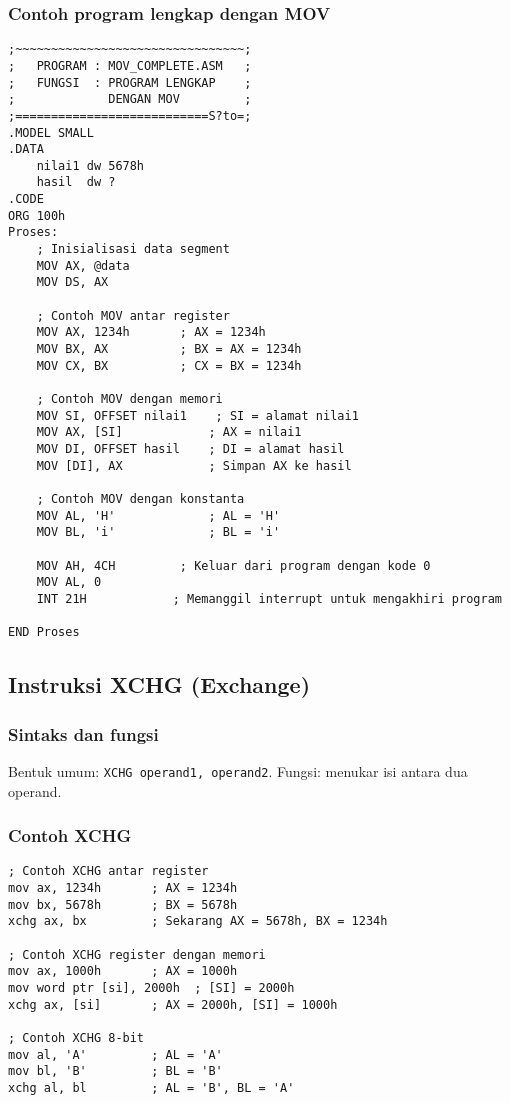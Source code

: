 \documentclass[../main.tex]{subfiles}
\begin{document}
            \subsubsection{Contoh program lengkap dengan MOV}
\begin{lstlisting}[language={[x86masm]Assembler}, caption=Program Lengkap dengan MOV, label={lst:mov-complete}]
;~~~~~~~~~~~~~~~~~~~~~~~~~~~~~~~~;
;   PROGRAM : MOV_COMPLETE.ASM   ;
;   FUNGSI  : PROGRAM LENGKAP    ;
;             DENGAN MOV         ;
;===========================S?to=;
.MODEL SMALL
.DATA
    nilai1 dw 5678h
    hasil  dw ?
.CODE
ORG 100h
Proses:
    ; Inisialisasi data segment
    MOV AX, @data
    MOV DS, AX
    
    ; Contoh MOV antar register
    MOV AX, 1234h       ; AX = 1234h
    MOV BX, AX          ; BX = AX = 1234h
    MOV CX, BX          ; CX = BX = 1234h
    
    ; Contoh MOV dengan memori
    MOV SI, OFFSET nilai1    ; SI = alamat nilai1
    MOV AX, [SI]            ; AX = nilai1
    MOV DI, OFFSET hasil    ; DI = alamat hasil
    MOV [DI], AX            ; Simpan AX ke hasil
    
    ; Contoh MOV dengan konstanta
    MOV AL, 'H'             ; AL = 'H'
    MOV BL, 'i'             ; BL = 'i'
    
    MOV AH, 4CH         ; Keluar dari program dengan kode 0
    MOV AL, 0
    INT 21H            ; Memanggil interrupt untuk mengakhiri program

END Proses
\end{lstlisting}

        \subsection{Instruksi XCHG (Exchange)}
            \subsubsection{Sintaks dan fungsi}
Bentuk umum: \texttt{XCHG operand1, operand2}. Fungsi: menukar isi antara dua operand.

            \subsubsection{Contoh XCHG}
\begin{lstlisting}[language={[x86masm]Assembler}, caption=Instruksi XCHG, label={lst:xchg-examples}]
; Contoh XCHG antar register
mov ax, 1234h       ; AX = 1234h
mov bx, 5678h       ; BX = 5678h
xchg ax, bx         ; Sekarang AX = 5678h, BX = 1234h

; Contoh XCHG register dengan memori
mov ax, 1000h       ; AX = 1000h
mov word ptr [si], 2000h  ; [SI] = 2000h
xchg ax, [si]       ; AX = 2000h, [SI] = 1000h

; Contoh XCHG 8-bit
mov al, 'A'         ; AL = 'A'
mov bl, 'B'         ; BL = 'B'
xchg al, bl         ; AL = 'B', BL = 'A'
\end{lstlisting}
\end{document}
